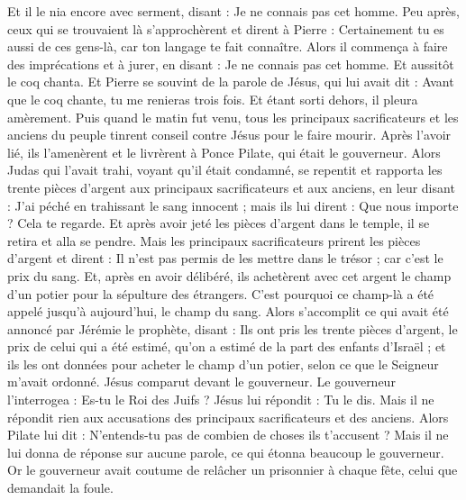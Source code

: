 \begin{multicols}{2}
Et il le nia encore avec serment, disant : Je ne connais pas cet homme.
Peu après, ceux qui se trouvaient là s'approchèrent et dirent à Pierre : Certainement tu es aussi de ces gens-là, car ton langage te fait connaître.
Alors il commença à faire des imprécations et à jurer, en disant : Je ne connais pas cet homme. Et aussitôt le coq chanta.
Et Pierre se souvint de la parole de Jésus, qui lui avait dit : Avant que le coq chante, tu me renieras trois fois. Et étant sorti dehors, il pleura amèrement.
\VerseOne{}Puis quand le matin fut venu, tous les principaux sacrificateurs et les anciens du peuple tinrent conseil contre Jésus pour le faire mourir.
Après l'avoir lié, ils l'amenèrent et le livrèrent à Ponce Pilate, qui était le gouverneur.
Alors Judas qui l'avait trahi, voyant qu'il était condamné, se repentit et rapporta les trente pièces d'argent aux principaux sacrificateurs et aux anciens,
en leur disant : J'ai péché en trahissant le sang innocent ; mais ils lui dirent : Que nous importe ? Cela te regarde.
Et après avoir jeté les pièces d'argent dans le temple, il se retira et alla se pendre.
Mais les principaux sacrificateurs prirent les pièces d'argent et dirent : Il n'est pas permis de les mettre dans le trésor ; car c'est le prix du sang.
Et, après en avoir délibéré, ils achetèrent avec cet argent le champ d'un potier pour la sépulture des étrangers.
C'est pourquoi ce champ-là a été appelé jusqu'à aujourd'hui, le champ du sang.
Alors s'accomplit ce qui avait été annoncé par Jérémie le prophète, disant : Ils ont pris les trente pièces d'argent, le prix de celui qui a été estimé, qu'on a estimé de la part des enfants d'Israël ;
et ils les ont données pour acheter le champ d'un potier, selon ce que le Seigneur m'avait ordonné.
Jésus comparut devant le gouverneur. Le gouverneur l'interrogea : Es-tu le Roi des Juifs ? Jésus lui répondit : Tu le dis.
Mais il ne répondit rien aux accusations des principaux sacrificateurs et des anciens.
Alors Pilate lui dit : N'entends-tu pas de combien de choses ils t'accusent ?
Mais il ne lui donna de réponse sur aucune parole, ce qui étonna beaucoup le gouverneur.
Or le gouverneur avait coutume de relâcher un prisonnier à chaque fête, celui que demandait la foule.

\end{multicols}
